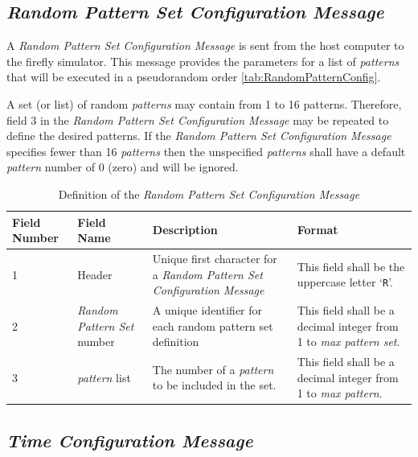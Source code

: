 \documentclass[letterpaper,11pt]{article}
\begin{document}
\subsection{\textit{Random Pattern Set Configuration Message}}

A \textit{Random Pattern Set Configuration Message} is sent from the host
computer to the firefly simulator. This message provides the parameters for
a list of \textit{patterns} that will be executed in a pseudorandom order
\ref{tab:RandomPatternConfig}.

A set (or list) of random \textit{patterns} may contain from 1 to 16 patterns.
Therefore, field 3 in the \textit{Random Pattern Set Configuration Message} may
be repeated to define the desired patterns. If the \textit{Random Pattern Set
Configuration Message} specifies fewer than 16 \textit{patterns} then the
unspecified \textit{patterns} shall have a default \textit{pattern} number of
0 (zero) and will be ignored.

\begin{table}[H]
\centering
\caption{Definition of the \textit{Random Pattern Set Configuration Message}}
\label{tab:PatternSetConfig}
\setlength\extrarowheight{2pt}
\begin{tabular}[h]{|p{0.5in}|p{1.00in}|p{2.25in}|p{2.25in}|} \hline
Field Number & Field Name & Description & Format \\ \hline
1            & Header
             & Unique first character for a \textit{Random Pattern Set
               Configuration Message}
             & This field shall be the uppercase letter `\texttt{R}'.
             \\ \hline
2            & \textit{Random Pattern Set} number
             & A unique identifier for each random pattern set definition
             & This field shall be a decimal integer from 1 to \textit{max
             pattern set}.
             \\ \hline
3            & \textit{pattern} list
             & The number of a \textit{pattern} to be included in the set.
             & This field shall be a decimal integer from 1 to \textit{max
             pattern}.
             \\ \hline
\end{tabular}
\end{table}

\subsection{\textit{Time Configuration Message}}
\end{document}
